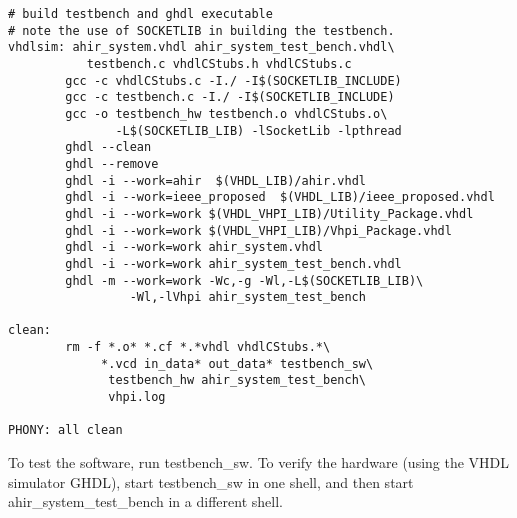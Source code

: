 \documentclass{article}
\begin{document}
\begin{verbatim}
# build testbench and ghdl executable
# note the use of SOCKETLIB in building the testbench.
vhdlsim: ahir_system.vhdl ahir_system_test_bench.vhdl\
           testbench.c vhdlCStubs.h vhdlCStubs.c
        gcc -c vhdlCStubs.c -I./ -I$(SOCKETLIB_INCLUDE)
        gcc -c testbench.c -I./ -I$(SOCKETLIB_INCLUDE)
        gcc -o testbench_hw testbench.o vhdlCStubs.o\
               -L$(SOCKETLIB_LIB) -lSocketLib -lpthread
        ghdl --clean
        ghdl --remove
        ghdl -i --work=ahir  $(VHDL_LIB)/ahir.vhdl
        ghdl -i --work=ieee_proposed  $(VHDL_LIB)/ieee_proposed.vhdl
        ghdl -i --work=work $(VHDL_VHPI_LIB)/Utility_Package.vhdl
        ghdl -i --work=work $(VHDL_VHPI_LIB)/Vhpi_Package.vhdl
        ghdl -i --work=work ahir_system.vhdl
        ghdl -i --work=work ahir_system_test_bench.vhdl
        ghdl -m --work=work -Wc,-g -Wl,-L$(SOCKETLIB_LIB)\
                 -Wl,-lVhpi ahir_system_test_bench 
        
clean:
        rm -f *.o* *.cf *.*vhdl vhdlCStubs.*\
             *.vcd in_data* out_data* testbench_sw\
              testbench_hw ahir_system_test_bench\
              vhpi.log

PHONY: all clean	
\end{verbatim}
To test the software, run testbench\_sw.  To verify the hardware (using
the VHDL simulator GHDL), start testbench\_sw in one shell, and then start ahir\_system\_test\_bench
in a different shell.
\end{document}
